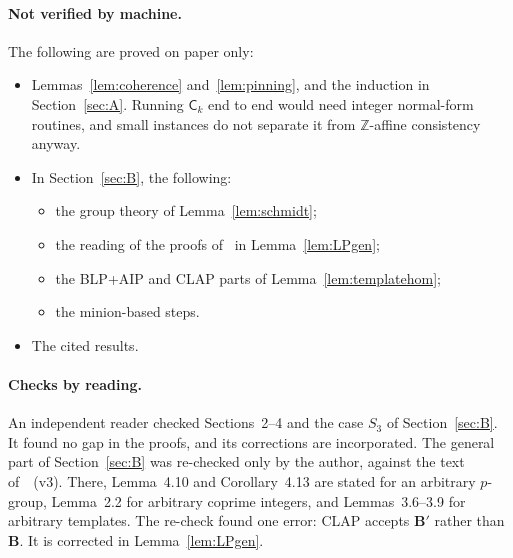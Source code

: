 \documentclass[11pt]{article}
\theoremstyle{definition}
\theoremstyle{remark}
\newcommand{\Coh}{\mathsf{C}}
\newcommand{\Z}{\mathbb Z}
\begin{document}
\paragraph{Not verified by machine.} The following are proved on paper only:
\begin{itemize}
\item Lemmas~\ref{lem:coherence} and~\ref{lem:pinning}, and the induction in
Section~\ref{sec:A}. Running $\Coh_k$ end to end would need integer normal-form
routines, and small instances do not separate it from $\Z$-affine consistency
anyway.
\item In Section~\ref{sec:B}, the following:
\begin{itemize}
\item the group theory of Lemma~\ref{lem:schmidt};
\item the reading of the proofs of~\cite{LP25} in Lemma~\ref{lem:LPgen};
\item the BLP+AIP and CLAP parts of Lemma~\ref{lem:templatehom};
\item the minion-based steps.
\end{itemize}
\item The cited results.
\end{itemize}

\paragraph{Checks by reading.} An independent reader checked Sections~2--4 and
the case $S_3$ of Section~\ref{sec:B}. It found no gap in the proofs, and its
corrections are incorporated. The
general part of Section~\ref{sec:B} was re-checked only by the author, against
the text of~\cite{LP25}~(v3). There, Lemma~4.10 and Corollary~4.13 are stated
for an arbitrary $p$-group, Lemma~2.2 for arbitrary coprime integers, and
Lemmas~3.6--3.9 for arbitrary templates. The re-check found one error: CLAP
accepts $\mathbf B'$ rather than $\mathbf B$. It is corrected in
Lemma~\ref{lem:LPgen}.
\end{document}
